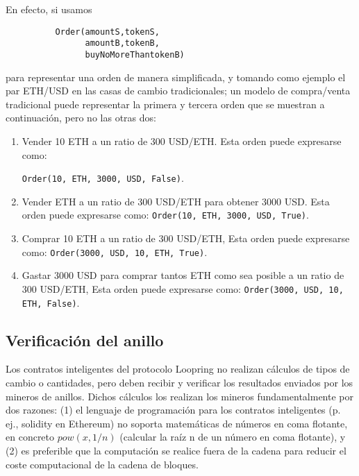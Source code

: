 \documentclass[UTF8,nofonts]{article}
\begin{document}
\begin{multicols}{2}
En efecto, si usamos


\begin{verbatim}
	      Order(amountS,tokenS,
	            amountB,tokenB,
	            buyNoMoreThantokenB)
\end{verbatim}

para representar una orden de manera simplificada, y tomando como ejemplo el par ETH/USD en las casas de cambio tradicionales; un modelo de compra/venta tradicional puede representar la primera y tercera orden que se muestran a continuación, pero no las otras dos:

\begin{enumerate}
	\item Vender 10 ETH a un ratio de 300 USD/ETH. Esta orden puede expresarse como:

{\setlength{\parskip}{0cm}\verb|Order(10, ETH, 3000, USD, False)|.}
	\item Vender ETH a un ratio de 300 USD/ETH para obtener 3000 USD. Esta orden puede expresarse como: \verb|Order(10, ETH, 3000, USD, True)|.
	\item Comprar 10 ETH a un ratio de 300 USD/ETH, Esta orden puede expresarse como: \verb|Order(3000, USD, 10, ETH, True)|.
	\item Gastar 3000 USD para comprar tantos ETH como sea posible a un ratio de 300 USD/ETH, Esta orden puede expresarse como: \verb|Order(3000, USD, 10, ETH, False)|.
\end{enumerate}



\subsection{Verificación del anillo\label{sec:ring_verification}}

Los contratos inteligentes del protocolo Loopring no realizan cálculos de tipos de cambio o cantidades, pero deben recibir y verificar los resultados enviados por los mineros de anillos. Dichos cálculos los realizan los mineros fundamentalmente por dos razones: (1) el lenguaje de programación para los contratos inteligentes (p. ej., solidity \cite{dannen2017introducing} en Ethereum) no soporta matemáticas de números en coma flotante, en concreto $pow(x, 1/n)$ (calcular la raíz n de un número en coma flotante), y (2) es preferible que la computación se realice fuera de la cadena para reducir el coste computacional de la cadena de bloques.



\end{multicols}
\end{document}
